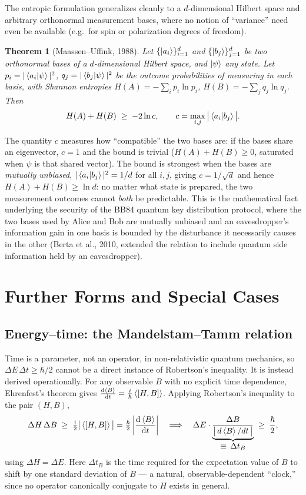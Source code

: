 \documentclass[11pt]{article}
\theoremstyle{plain}
\newtheorem{theorem}{Theorem}[section]
\theoremstyle{definition}
\theoremstyle{remark}
\begin{document}
The entropic formulation generalizes cleanly to a $d$-dimensional Hilbert space and arbitrary
orthonormal measurement bases, where no notion of ``variance'' need even be available (e.g.\ for
spin or polarization degrees of freedom).

\begin{theorem}[Maassen--Uffink, 1988]
Let $\{\ket{a_i}\}_{i=1}^d$ and $\{\ket{b_j}\}_{j=1}^d$ be two orthonormal bases of a
$d$-dimensional Hilbert space, and $\ket\psi$ any state. Let $p_i = |\ip{a_i}{\psi}|^2$,
$q_j = |\ip{b_j}{\psi}|^2$ be the outcome probabilities of measuring in each basis, with Shannon
entropies $H(A)=-\sum_i p_i \ln p_i$, $H(B) = -\sum_j q_j \ln q_j$. Then
\[
H(A) + H(B) \;\geq\; -2\ln c , \qquad
c = \max_{i,j} \big|\ip{a_i}{b_j}\big| .
\]
\end{theorem}

The quantity $c$ measures how ``compatible'' the two bases are: if the bases share an eigenvector,
$c=1$ and the bound is trivial ($H(A)+H(B)\ge 0$, saturated when $\psi$ is that shared vector).
The bound is strongest when the bases are \emph{mutually unbiased}, $|\ip{a_i}{b_j}|^2 = 1/d$ for
all $i,j$, giving $c = 1/\sqrt d$ and hence $H(A)+H(B)\geq \ln d$: no matter what state is
prepared, the two measurement outcomes cannot \emph{both} be predictable. This is the mathematical
fact underlying the security of the BB84 quantum key distribution protocol, where the two bases
used by Alice and Bob are mutually unbiased and an eavesdropper's information gain in one basis is
bounded by the disturbance it necessarily causes in the other (Berta et al., 2010, extended the
relation to include quantum side information held by an eavesdropper).

\section{Further Forms and Special Cases}

\subsection{Energy--time: the Mandelstam--Tamm relation}

Time is a parameter, not an operator, in non-relativistic quantum mechanics, so
$\Delta E\,\Delta t \geq \hbar/2$ cannot be a direct instance of Robertson's inequality. It is
instead derived operationally. For any observable $B$ with no explicit time dependence,
Ehrenfest's theorem gives $\dv{\expval{B}}{t} = \frac{i}{\hbar}\expval{[H,B]}$. Applying
Robertson's inequality to the pair $(H,B)$,
\[
\Delta H\, \Delta B \;\geq\; \tfrac12\big|\expval{[H,B]}\big|
= \tfrac{\hbar}{2}\left|\dv{\expval{B}}{t}\right|
\quad\Longrightarrow\quad
\Delta E \cdot \underbrace{\frac{\Delta B}{\big|\, d\expval{B}/dt \,\big|}}_{\displaystyle \equiv\, \Delta t_B} \;\geq\; \frac{\hbar}{2},
\]
using $\Delta H = \Delta E$. Here $\Delta t_B$ is the time required for the expectation value of
$B$ to shift by one standard deviation of $B$ --- a natural, observable-dependent ``clock,'' since
no operator canonically conjugate to $H$ exists in general.
\end{document}
